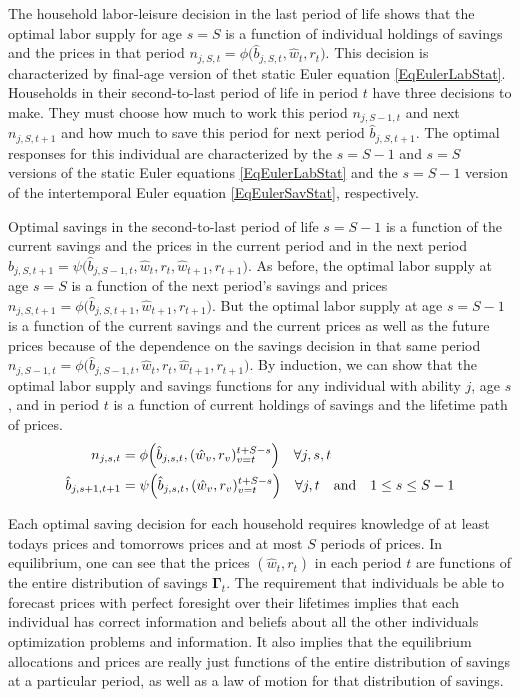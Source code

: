 \documentclass[letterpaper,12pt]{article}
\theoremstyle{definition}
\begin{document}
    \begin{spacing}{1.5}
    \vspace{10mm}

    \noindent The household labor-leisure decision in the last period of life shows that the optimal labor supply for age $s=S$ is a function of individual holdings of savings and the prices in that period $n_{j,S,t}=\phi\bigl(\hat{b}_{j,S,t},\hat{w}_t,r_t\bigr)$. This decision is characterized by final-age version of thet static Euler equation \eqref{EqEulerLabStat}. Households in their second-to-last period of life in period $t$ have three decisions to make. They must choose how much to work this period $n_{j,S-1,t}$ and next $n_{j,S,t+1}$ and how much to save this period for next period $\hat{b}_{j,S,t+1}$. The optimal responses for this individual are characterized by the $s=S-1$ and $s=S$ versions of the static Euler equations \eqref{EqEulerLabStat} and the $s=S-1$ version of the intertemporal Euler equation \eqref{EqEulerSavStat}, respectively.

    Optimal savings in the second-to-last period of life $s=S-1$ is a function of the current savings and the prices in the current period and in the next period $\hat{b}_{j,S,t+1} = \psi\bigl(\hat{b}_{j,S-1,t},\hat{w}_t,r_t,\hat{w}_{t+1},r_{t+1}\bigr)$. As before, the optimal labor supply at age $s=S$ is a function of the next period's savings and prices $n_{j,S,t+1}=\phi\bigl(\hat{b}_{j,S,t+1},\hat{w}_{t+1},r_{t+1}\bigr)$. But the optimal labor supply at age $s=S-1$ is a function of the current savings and the current prices as well as the future prices because of the dependence on the savings decision in that same period $n_{j,S-1,t}=\phi\bigl(\hat{b}_{j,S-1,t},\hat{w}_t,r_t,\hat{w}_{t+1},r_{t+1}\bigr)$. By induction, we can show that the optimal labor supply and savings functions for any individual with ability $j$, age $s$, and in period $t$ is a function of current holdings of savings and the lifetime path of prices.
    \begin{align}
      n_{j,s,t} &= \phi\Bigl(\hat{b}_{j,s,t},(\hat{w}_v,r_v)_{v=t}^{t+S-s}\Bigr) \quad\forall j,s,t \label{EqLabPolFuncGen} \\
      \hat{b}_{j,s+1,t+1} &= \psi\Bigl(\hat{b}_{j,s,t},(\hat{w}_v,r_v)_{v=t}^{t+S-s}\Bigr) \quad\forall j,t \quad\text{and}\quad 1\leq s\leq S-1
    \end{align}

    Each optimal saving decision for each household requires knowledge of at least todays prices and tomorrows prices and at most $S$ periods of prices. In equilibrium, one can see that the prices $(\hat{w}_t,r_t)$ in each period $t$ are functions of the entire distribution of savings $\bm{\Gamma}_t$. The requirement that individuals be able to forecast prices with perfect foresight over their lifetimes implies that each individual has correct information and beliefs about all the other individuals optimization problems and information. It also implies that the equilibrium allocations and prices are really just functions of the entire distribution of savings at a particular period, as well as a law of motion for that distribution of savings.


\end{spacing}
\end{document}
